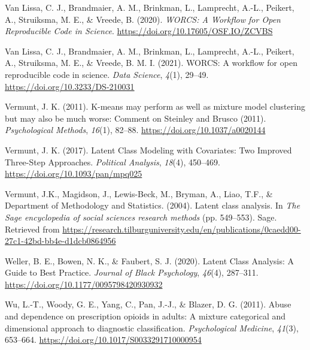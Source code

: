 \documentclass[
  ,man,floatsintext]{apa6}
\newlength{\cslhangindent}
\newlength{\cslentryspacingunit} %
\newenvironment{CSLReferences}[2] %
 {%
  \setlength{\parindent}{0pt}
  \ifodd #1
  \let\oldpar\par
  \def\par{\hangindent=\cslhangindent\oldpar}
  \fi
  \setlength{\parskip}{#2\cslentryspacingunit}
 }%
 {}
\begin{document}
\begin{CSLReferences}{1}{0}
\leavevmode{}%
Van Lissa, C. J., Brandmaier, A. M., Brinkman, L., Lamprecht, A.-L., Peikert, A., Struiksma, M. E., \& Vreede, B. (2020). \emph{{WORCS}: {A} {Workflow} for {Open} {Reproducible} {Code} in {Science}}. \url{https://doi.org/10.17605/OSF.IO/ZCVBS}

\leavevmode{}%
Van Lissa, C. J., Brandmaier, A. M., Brinkman, L., Lamprecht, A.-L., Peikert, A., Struiksma, M. E., \& Vreede, B. M. I. (2021). {WORCS}: {A} workflow for open reproducible code in science. \emph{Data Science}, \emph{4}(1), 29--49. \url{https://doi.org/10.3233/DS-210031}

\leavevmode{}%
Vermunt, J. K. (2011). K-means may perform as well as mixture model clustering but may also be much worse: {Comment} on {Steinley} and {Brusco} (2011). \emph{Psychological Methods}, \emph{16}(1), 82--88. \url{https://doi.org/10.1037/a0020144}

\leavevmode{}%
Vermunt, J. K. (2017). Latent {Class} {Modeling} with {Covariates}: {Two} {Improved} {Three}-{Step} {Approaches}. \emph{Political Analysis}, \emph{18}(4), 450--469. \url{https://doi.org/10.1093/pan/mpq025}

\leavevmode{}%
Vermunt, J.K., Magidson, J., Lewis-Beck, M., Bryman, A., Liao, T.F., \& Department of Methodology and Statistics. (2004). Latent class analysis. In \emph{The {Sage} encyclopedia of social sciences research methods} (pp. 549--553). Sage. Retrieved from \url{https://research.tilburguniversity.edu/en/publications/0caedd00-27c1-42bd-bb4e-d1dcb0864956}

\leavevmode{}%
Weller, B. E., Bowen, N. K., \& Faubert, S. J. (2020). Latent {Class} {Analysis}: {A} {Guide} to {Best} {Practice}. \emph{Journal of Black Psychology}, \emph{46}(4), 287--311. \url{https://doi.org/10.1177/0095798420930932}

\leavevmode{}%
Wu, L.-T., Woody, G. E., Yang, C., Pan, J.-J., \& Blazer, D. G. (2011). Abuse and dependence on prescription opioids in adults: A mixture categorical and dimensional approach to diagnostic classification. \emph{Psychological Medicine}, \emph{41}(3), 653--664. \url{https://doi.org/10.1017/S0033291710000954}

\end{CSLReferences}
\end{document}
